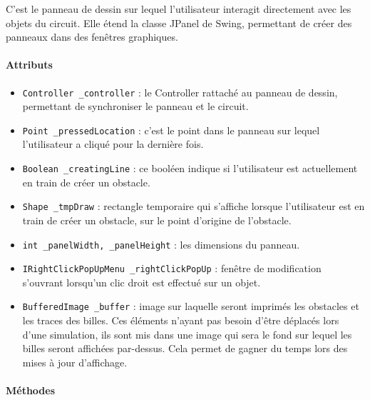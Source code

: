 \documentclass{report}
\begin{document}
C'est le panneau de dessin sur lequel l'utilisateur interagit directement avec les objets du circuit. Elle étend la classe JPanel de Swing, permettant de créer des panneaux dans des fenêtres graphiques.

\paragraph*{Attributs}

\begin{itemize}
\item \texttt{Controller \_controller} : le Controller rattaché au panneau de dessin, permettant de synchroniser le panneau et le circuit.
\item \texttt{Point \_pressedLocation} : c'est le point dans le panneau sur lequel l'utilisateur a cliqué pour la dernière fois.
\item \texttt{Boolean \_creatingLine} : ce booléen indique si l'utilisateur est actuellement en train de créer un obstacle.
\item \texttt{Shape \_tmpDraw} : rectangle temporaire qui s'affiche lorsque l'utilisateur est en train de créer un obstacle, sur le point d'origine de l'obstacle.
\item \texttt{int \_panelWidth, \_panelHeight} : les dimensions du panneau.
\item \texttt{IRightClickPopUpMenu \_rightClickPopUp} : fenêtre de modification s'ouvrant lorsqu'un clic droit est effectué sur un objet.
\item \texttt{BufferedImage \_buffer} : image sur laquelle seront imprimés les obstacles et les traces des billes. Ces éléments n'ayant pas besoin d'être déplacés lors d'une simulation, ils sont mis dans une image qui sera le fond sur lequel les billes seront affichées par-dessus. Cela permet de gagner du temps lors des mises à jour d'affichage.
\end{itemize}

\paragraph*{Méthodes}
\end{document}

